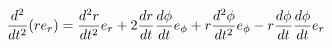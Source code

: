 \documentclass[preview]{standalone}
\begin{document}
\begin{align*}
\frac{d^2}{dt^2} ( r e_r ) = {d^2 r \over dt^2} e_r + 2 {d r \over dt} {d \phi \over dt} e_\phi + r {d^2 \phi \over dt^2} e_\phi - r {d \phi \over dt} {d \phi \over dt} e_{ r}
\end{align*}
\end{document}
